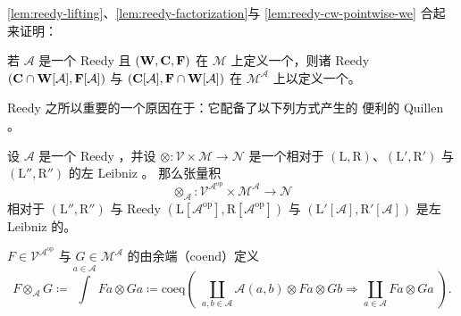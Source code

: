 \cref{lem:reedy-lifting}、\cref{lem:reedy-factorization}与
\cref{lem:reedy-cw-pointwise-we} 合起来证明：

\begin{theorem}\label{thm:reedy-model-structure}
若 $\mathcal{A}$ 是一个 Reedy \trCategory{}且 $(\mathbf{W},\mathbf{C},\mathbf{F})$ 在
$\mathcal{M}$ 上定义一个\trModelStructure，则诸 Reedy
\trWeakFactorizationSystem{} $(\mathbf{C}\cap\mathbf{W}[\mathcal{A}],\mathbf{F}[\mathcal{A}])$
与 $(\mathbf{C}[\mathcal{A}],\mathbf{F}\cap\mathbf{W}[\mathcal{A}])$ 在 $\mathcal{M}^{\mathcal{A}}$
上以\trPointwise{}\trWeakEquivalence{}定义一个\trModelStructure。
\end{theorem}

Reedy \trModelStructure{}之所以重要的一个原因在于：它配备了以下列方式产生的
便利的 Quillen \trBifunctor。

\begin{theorem}\label{thm:functor-tensor-product-leibniz}
设 $\mathcal{A}$ 是一个 Reedy \trCategory，并设 $\otimes\colon\mathcal{V}\times\mathcal{M}\to\mathcal{N}$
是一个相对于\trWeakFactorizationSystem{} $(\mathrm{L},\mathrm{R})$、$(\mathrm{L}',\mathrm{R}')$
与 $(\mathrm{L}'',\mathrm{R}'')$ 的左 Leibniz \trBifunctor。
那么\trFunctor{}张量积
\[
\otimes_{\mathcal{A}}\colon\mathcal{V}^{\mathcal{A}^{\mathrm{op}}}\times
\mathcal{M}^{\mathcal{A}}\to\mathcal{N}
\]
相对于 $(\mathrm{L}'',\mathrm{R}'')$ 与 Reedy \trWeakFactorizationSystem{}
$(\mathrm{L}[\mathcal{A}^{\mathrm{op}}],\mathrm{R}[\mathcal{A}^{\mathrm{op}}])$
与 $(\mathrm{L}'[\mathcal{A}],\mathrm{R}'[\mathcal{A}])$ 是左 Leibniz 的。
\end{theorem}
$F\in\mathcal{V}^{\mathcal{A}^{\mathrm{op}}}$ 与 $G\in\mathcal{M}^{\mathcal{A}}$
的\textbf{\trFunctor{}\trTensorProduct}由余端（coend）定义
\[
F\otimes_{\mathcal{A}}G\coloneqq\int\limits^{a\in\mathcal{A}}Fa\otimes Ga
\coloneqq\mathrm{coeq}\left(\;
\coprod_{a,b\in\mathcal{A}}\mathcal{A}(a,b)\otimes Fa\otimes Gb
\Longrightarrow
\coprod_{a\in\mathcal{A}}Fa\otimes Ga\;\right).
\]

